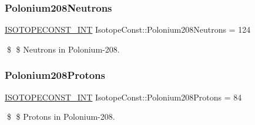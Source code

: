 \subsubsection{\texorpdfstring{Polonium208\+Neutrons}{Polonium208Neutrons}}
{\footnotesize\ttfamily \mbox{\hyperlink{group___isotope_const-_macros_ga5f18360b3e99483a35c32d789e62621c}{I\+S\+O\+T\+O\+P\+E\+C\+O\+N\+S\+T\+\_\+\+I\+NT}} Isotope\+Const\+::\+Polonium208\+Neutrons = 124}

\$ \$ Neutrons in Polonium-\/208. \mbox{\label{group___isotope_const-_polonium-_po208_ga805e1c6c1e3922ac61264a9cd2312dc9}} 
\subsubsection{\texorpdfstring{Polonium208\+Protons}{Polonium208Protons}}
{\footnotesize\ttfamily \mbox{\hyperlink{group___isotope_const-_macros_ga5f18360b3e99483a35c32d789e62621c}{I\+S\+O\+T\+O\+P\+E\+C\+O\+N\+S\+T\+\_\+\+I\+NT}} Isotope\+Const\+::\+Polonium208\+Protons = 84}

\$ \$ Protons in Polonium-\/208. 